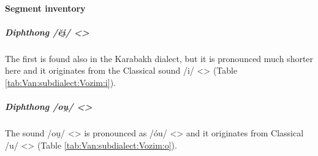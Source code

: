 \paragraph{Segment inventory}
\subparagraph{Diphthong /ĕi̯/ <>}\label{sec:Van:subdialect:Vozim:seg:diphej}

The first is found also in the Karabakh dialect, but it is pronounced much shorter here and it originates from the Classical sound /i/ <> (Table \ref{tab:Van:subdialect:Vozim:i}). 

\begin{table}[H]
	\centering
	\caption{Change from Classical Armenian /i/ <> to /ĕi̯/ <> in the Vozim subdialect of the Van dialect}
	\label{tab:Van:subdialect:Vozim:i}
\end{table} 

\subparagraph{Diphthong /ou̯/ <> }
The sound /ou̯/ <> is pronounced as /\'ou/ <> and it originates from Classical /u/ <> (Table \ref{tab:Van:subdialect:Vozim:o}).

